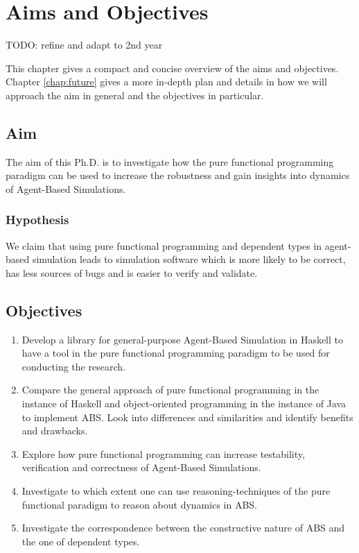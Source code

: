 \chapter{Aims and Objectives}
\label{chap:aimsObj}

TODO: refine and adapt to 2nd year

This chapter gives a compact and concise overview of the aims and objectives. Chapter \ref{chap:future} gives a more in-depth plan and details in how we will approach the aim in general and the objectives in particular.

\section{Aim}
The aim of this Ph.D. is to investigate how the pure functional programming paradigm can be used to increase the robustness and gain insights into dynamics of Agent-Based Simulations.

\subsection{Hypothesis}
We claim that using pure functional programming and dependent types in agent-based simulation leads to simulation software which is more likely to be correct, has less sources of bugs and is easier to verify and validate.

\section{Objectives}
\begin{enumerate}
	\item Develop a library for general-purpose Agent-Based Simulation in Haskell to have a tool in the pure functional programming paradigm to be used for conducting the research.

	\item Compare the general approach of pure functional programming in the instance of Haskell and object-oriented programming in the instance of Java to implement ABS. Look into differences and similarities and identify benefits and drawbacks.

	\item Explore how pure functional programming can increase testability, verification and correctness of Agent-Based Simulations.

	\item Investigate to which extent one can use reasoning-techniques of the pure functional paradigm to reason about dynamics in ABS.
	
	\item Investigate the correspondence between the constructive nature of ABS and the one of dependent types.
\end{enumerate}